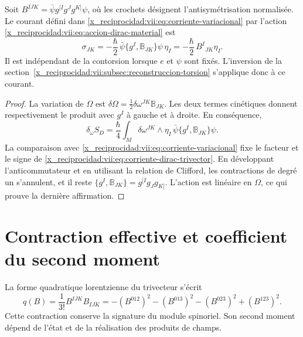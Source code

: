\begin{proposition}
\label{x_reciprocidad:vii:prop:corriente-dirac-explicita}
Soit
\(B^{IJK}=\bar\psi g^{[I}g^Jg^{K]}\psi\), où les crochets
désignent l'antisymétrisation normalisée. Le courant défini dans
\eqref{x_reciprocidad:vii:eq:corriente-variacional} par l'action
\eqref{x_reciprocidad:vii:eq:accion-dirac-material} est
\begin{equation}
 \sigma_{JK}
 =-\frac{\hbar}{2}\,
   \bar\psi\{g^I,\mathbb B_{JK}\}\psi\,\eta_I
 =-\frac{\hbar}{2}\,B^I{}_{JK}\eta_I.
 \label{x_reciprocidad:vii:eq:corriente-dirac-trivector}
\end{equation}
Il est indépendant de la contorsion lorsque \(e\) et \(\psi\) sont
fixés. L'inversion de la section~\ref{x_reciprocidad:vii:subsec:reconstruccion-torsion}
s'applique donc à ce courant.
\end{proposition}
\begin{proof}
La variation de \(\Omega\) est \(\delta\Omega=\frac12\delta\omega^{JK}\mathbb B_{JK}\). Les deux termes cinétiques donnent respectivement le produit avec \(g^I\) à gauche et à droite. En conséquence,
\[
 \delta_\omega S_D
 =\frac{\hbar}{4}\int_M\delta\omega^{JK}\wedge\eta_I\,
                 \bar\psi\{g^I,\mathbb B_{JK}\}\psi.
\]
La comparaison avec \eqref{x_reciprocidad:vii:eq:corriente-variacional} fixe le
facteur et le signe de \eqref{x_reciprocidad:vii:eq:corriente-dirac-trivector}.
En développant l'anticommutateur et en utilisant la relation de Clifford,
les contractions de degré un s'annulent, et il reste
\(\{g^I,\mathbb B_{JK}\}=g^{[I}g_Jg_{K]}\).
L'action est linéaire en \(\Omega\), ce qui prouve la dernière
affirmation.
\end{proof}

\section{Contraction effective et coefficient du second moment}
\label{x_reciprocidad:vii:subsec:contraccion-espinorial}

La forme quadratique lorentzienne du trivecteur s'écrit
\begin{equation}
 q(B)=\frac1{3!}B^{IJK}B_{IJK}
 =-(B^{012})^2-(B^{013})^2-(B^{023})^2+(B^{123})^2.
 \label{x_reciprocidad:vii:eq:cuadratica-trivector}
\end{equation}
Cette contraction conserve la signature du module spinoriel. Son second moment dépend de l'état et de la réalisation des produits de champs.

